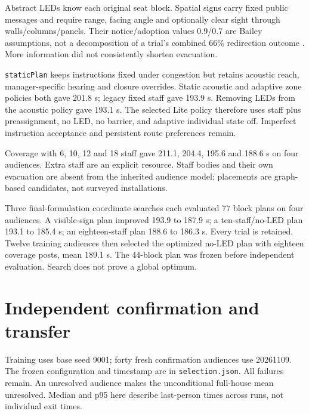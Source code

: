 \documentclass[11pt,a4paper]{article}
\newcommand{\code}[1]{{\small\nolinkurl{#1}}}
\begin{document}
Abstract LEDs know each original seat block. Spatial signs carry fixed public messages and require range, facing angle and optionally clear sight through walls/columns/panels. Their notice/adoption values 0.9/0.7 are Bailey assumptions, not a decomposition of a trial's combined 66\% redirection outcome \cite{R8,R9}. More information did not consistently shorten evacuation.


\code{staticPlan} keeps instructions fixed under congestion but retains acoustic reach, manager-specific hearing and closure overrides. Static acoustic and adaptive zone policies both gave 201.8 s; legacy fixed staff gave 193.9 s. Removing LEDs from the acoustic policy gave 193.1 s. The selected Lite policy therefore uses staff plus preassignment, no LED, no barrier, and adaptive individual state off. Imperfect instruction acceptance and persistent route preferences remain.


Coverage with 6, 10, 12 and 18 staff gave 211.1, 204.4, 195.6 and 188.6 s on four audiences. Extra staff are an explicit resource. Staff bodies and their own evacuation are absent from the inherited audience model; placements are graph-based candidates, not surveyed installations.


Three final-formulation coordinate searches each evaluated 77 block plans on four audiences. A visible-sign plan improved 193.9 to 187.9 s; a ten-staff/no-LED plan 193.1 to 185.4 s; an eighteen-staff plan 188.6 to 186.3 s. Every trial is retained. Twelve training audiences then selected the optimized no-LED plan with eighteen coverage posts, mean 189.1 s. The 44-block plan was frozen before independent evaluation. Search does not prove a global optimum.


\section{Independent confirmation and transfer}

Training uses base seed 9001; forty fresh confirmation audiences use 20261109. The frozen configuration and timestamp are in \code{selection.json}. All failures remain. An unresolved audience makes the unconditional full-house mean unresolved. Median and p95 here describe last-person times across runs, not individual exit times.
\end{document}
